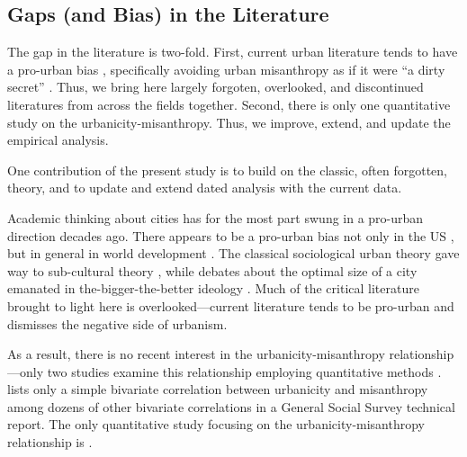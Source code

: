 \documentclass[11pt, letterpaper]{article}
\begin{document}
\begin{spacing}{1.4}
\section*{Gaps (and Bias) in the Literature} 

The gap in the literature is two-fold. First, current urban literature tends to
have a pro-urban bias \citep{peck16}, specifically avoiding urban misanthropy as if it were ``a
dirty secret'' \citep[p. 134]{thrift05}. Thus, we bring  here largely
forgoten, overlooked, and discontinued literatures from across the fields together. Second,
there is only one quantitative study on the urbanicity-misanthropy. Thus, we
improve, extend, and update the empirical analysis.

One contribution of the present study is to build on the classic, often forgotten, theory, and
to update and extend dated analysis with the current data. %


Academic thinking about cities has for the most part swung in a pro-urban
direction decades ago. {There appears to be a pro-urban bias not only in the US \citep{hansonCityJournalautumn15}, but in general in world development \citep{lipton77}.} The classical sociological urban theory \citep{wirth38,milgram70,park15,park84,simmel03,tonnies57} gave way to
  sub-cultural theory \citep{fischer75,fischer95,wilson85, palisi83}, while debates about the optimal size of a city \citep{richardson72,singell74,alonso60,alonso71,elgin75,capello00} emanated in the-bigger-the-better ideology \citep{glaeser11}. 
%
  Much of the critical literature brought to light here is overlooked---current
literature tends to be pro-urban and dismisses the negative side of urbanism.
  
As a result, there is no recent interest in the urbanicity-misanthropy relationship---only two studies examine this relationship employing quantitative methods \citep{wilson85,smith97}. \citet{smith97} lists only a simple bivariate correlation between urbanicity and misanthropy among dozens of other bivariate correlations in a General Social Survey technical report. 
 The only quantitative study focusing on the urbanicity-misanthropy
 relationship is \citet{wilson85}%
 .


\end{spacing}
\end{document}
